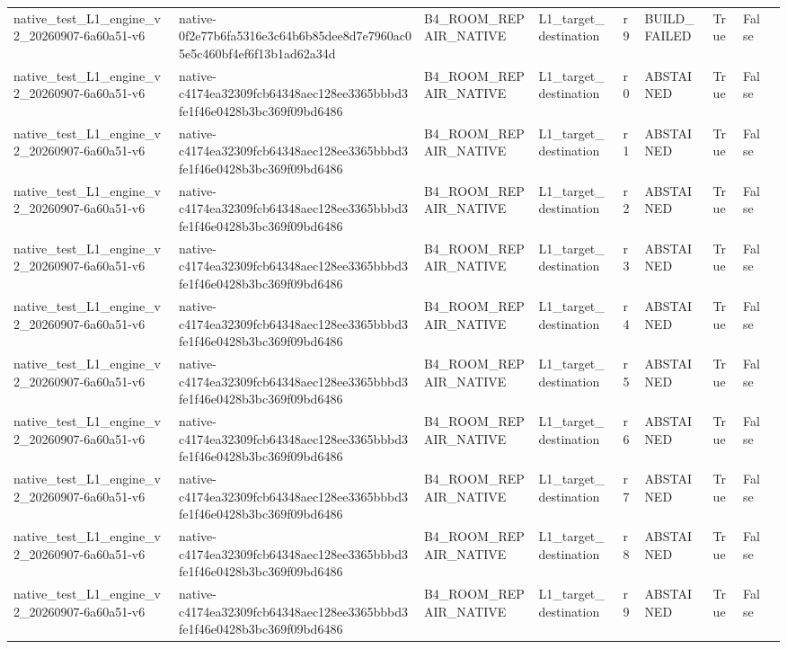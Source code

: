 \begin{tabular}{lllllllll}
native\_test\_L1\_engine\_v2\_20260907-6a60a51-v6 & native-0f2e77b6fa5316e3c64b6b85dee8d7e7960ac05e5c460bf4ef6f13b1ad62a34d & B4\_ROOM\_REPAIR\_NATIVE & L1\_target\_destination & r9 & BUILD\_FAILED & True & False &  \\
native\_test\_L1\_engine\_v2\_20260907-6a60a51-v6 & native-c4174ea32309fcb64348aec128ee3365bbbd3fe1f46e0428b3bc369f09bd6486 & B4\_ROOM\_REPAIR\_NATIVE & L1\_target\_destination & r0 & ABSTAINED & True & False &  \\
native\_test\_L1\_engine\_v2\_20260907-6a60a51-v6 & native-c4174ea32309fcb64348aec128ee3365bbbd3fe1f46e0428b3bc369f09bd6486 & B4\_ROOM\_REPAIR\_NATIVE & L1\_target\_destination & r1 & ABSTAINED & True & False &  \\
native\_test\_L1\_engine\_v2\_20260907-6a60a51-v6 & native-c4174ea32309fcb64348aec128ee3365bbbd3fe1f46e0428b3bc369f09bd6486 & B4\_ROOM\_REPAIR\_NATIVE & L1\_target\_destination & r2 & ABSTAINED & True & False &  \\
native\_test\_L1\_engine\_v2\_20260907-6a60a51-v6 & native-c4174ea32309fcb64348aec128ee3365bbbd3fe1f46e0428b3bc369f09bd6486 & B4\_ROOM\_REPAIR\_NATIVE & L1\_target\_destination & r3 & ABSTAINED & True & False &  \\
native\_test\_L1\_engine\_v2\_20260907-6a60a51-v6 & native-c4174ea32309fcb64348aec128ee3365bbbd3fe1f46e0428b3bc369f09bd6486 & B4\_ROOM\_REPAIR\_NATIVE & L1\_target\_destination & r4 & ABSTAINED & True & False &  \\
native\_test\_L1\_engine\_v2\_20260907-6a60a51-v6 & native-c4174ea32309fcb64348aec128ee3365bbbd3fe1f46e0428b3bc369f09bd6486 & B4\_ROOM\_REPAIR\_NATIVE & L1\_target\_destination & r5 & ABSTAINED & True & False &  \\
native\_test\_L1\_engine\_v2\_20260907-6a60a51-v6 & native-c4174ea32309fcb64348aec128ee3365bbbd3fe1f46e0428b3bc369f09bd6486 & B4\_ROOM\_REPAIR\_NATIVE & L1\_target\_destination & r6 & ABSTAINED & True & False &  \\
native\_test\_L1\_engine\_v2\_20260907-6a60a51-v6 & native-c4174ea32309fcb64348aec128ee3365bbbd3fe1f46e0428b3bc369f09bd6486 & B4\_ROOM\_REPAIR\_NATIVE & L1\_target\_destination & r7 & ABSTAINED & True & False &  \\
native\_test\_L1\_engine\_v2\_20260907-6a60a51-v6 & native-c4174ea32309fcb64348aec128ee3365bbbd3fe1f46e0428b3bc369f09bd6486 & B4\_ROOM\_REPAIR\_NATIVE & L1\_target\_destination & r8 & ABSTAINED & True & False &  \\
native\_test\_L1\_engine\_v2\_20260907-6a60a51-v6 & native-c4174ea32309fcb64348aec128ee3365bbbd3fe1f46e0428b3bc369f09bd6486 & B4\_ROOM\_REPAIR\_NATIVE & L1\_target\_destination & r9 & ABSTAINED & True & False &  \\

\end{tabular}
